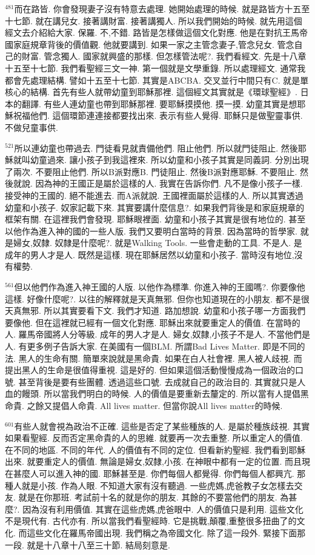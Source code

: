 \documentclass{book}
\begin{document}
$^{481}$而在路皆.
你會發現妻子沒有特意去處理.
她開始處理的時候.
就是路皆方十五至十七節.
就在講兒女.
接著講財富.
接著講獨人.
所以我們開始的時候.
就先用這個經文去介紹給大家.
保羅.
不,不錯.
路皆是怎樣做這個文化對應.
他是在對抗王馬帝國家庭規章背後的價值觀.
他就要講到.
如果一家之主管念妻子,管念兒女.
管念自己的財富.
管念獨人.
國家就興盛的那樣.
但怎樣管法呢?.
我們看經文.
先是十八章十五至十七節.
我們看聖經三文一神.
第一個就是文學重錄.
所以處理經文.
通常我都會先處理結構.
譬如十五至十七節.
其實是ABCBA.
交叉並行中間只有C.
就是單核心的結構.
首先有些人就帶幼童到耶穌那裡.
這個經文其實就是《環球聖經》.
日本的翻譯.
有些人連幼童也帶到耶穌那裡.
要耶穌摸摸他.
摸一摸.
幼童其實是想耶穌祝福他們.
這個環節連連接都要找出來.
表示有些人覺得.
耶穌只是做聖靈事供.
不做兒童事供.

$^{521}$所以連幼童也帶過去.
門徒看見就責備他們.
阻止他們.
所以就門徒阻止.
然後耶穌就叫幼童過來.
讓小孩子到我這裡來.
所以幼童和小孩子其實是同義詞.
分別出現了兩次.
不要阻止他們.
所以B派對應B.
門徒阻止.
然後B派對應耶穌.
不要阻止.
然後就說.
因為神的王國正是屬於這樣的人.
我實在告訴你們.
凡不是像小孩子一樣.
接受神的王國的.
絕不能進去.
而A派就說.
王國裡面屬於這樣的人.
所以其實透過幼童和小孩子.
奴家記載下來.
其實要講什麼信息?.
如果我們背後是和家庭規章的框架有關.
在這裡我們會發現.
耶穌眼裡面.
幼童和小孩子其實是很有地位的.
甚至以他作為進入神的國的一些人版.
我們又要明白當時的背景.
因為當時的哲學家.
就是婦女,奴隸.
奴隸是什麼呢?.
就是Walking Tools.
一些會走動的工具.
不是人.
是成年的男人才是人.
既然是這樣.
現在耶穌居然以幼童和小孩子.
當時沒有地位,沒有權勢.

$^{561}$但以他們作為進入神王國的人版.
以他作為標準.
你進入神的王國嗎?.
你要像他這樣.
好像什麼呢?.
以往的解釋就是天真無邪.
但你也知道現在的小朋友.
都不是很天真無邪.
所以其實要看下文.
我們才知道.
路加想說.
幼童和小孩子哪一方面我們要像他.
但在這裡就已經有一個文化對應.
耶穌出來就要重定人的價值.
在當時的人.
羅馬帝國將人分等級.
成年的男人才是人.
婦女,奴隸,小孩子不是人.
不當他們是人.
有更多例子告訴大家.
在美國有一個BLM.
所謂Bad Lives Matter.
即是不同的法.
黑人的生命有關.
簡單來說就是黑命貴.
如果在白人社會裡.
黑人被人歧視.
而提出黑人的生命是很值得重視.
這是好的.
但如果這個活動慢慢成為一個政治的口號.
甚至背後是要有些團體.
透過這些口號.
去成就自己的政治目的.
其實就只是人血的饅頭.
所以當我們明白的時候.
人的價值是要重新去釐定的.
所以當有人提倡黑命貴.
之餘又提倡人命貴.
All lives matter.
但當你說All lives matter的時候.

$^{601}$有些人就會視為政治不正確.
這些是否定了某些種族的人.
是屬於種族歧視.
其實如果看聖經.
反而否定黑命貴的人的思維.
就要再一次去重整.
所以重定人的價值.
在不同的地區.
不同的年代.
人的價值有不同的定位.
但看新約聖經.
我們看到耶穌出來.
就要重定人的價值.
無論是婦女,奴隸,小孩.
在神眼中都有一定的位置.
而且現在甚麼人可以進入神的國.
耶穌甚至是.
你們每個人都覺得.
你們每個人都興亢.
那種人就是小孩.
作為人眼.
不知道大家有沒有聽過.
一些虎媽,虎爸教子女怎樣去交友.
就是在你那班.
考試前十名的就是你的朋友.
其餘的不要當他們的朋友.
為甚麼?.
因為沒有利用價值.
其實在這些虎媽,虎爸眼中.
人的價值只是利用.
這些文化不是現代有.
古代亦有.
所以當我們看聖經時.
它是挑戰,顛覆,重整很多扭曲了的文化.
而這些文化在羅馬帝國出現.
我們稱之為帝國文化.
除了這一段外.
緊接下面那一段.
就是十八章十八至三十節.
結局刻意是.
\end{document}

